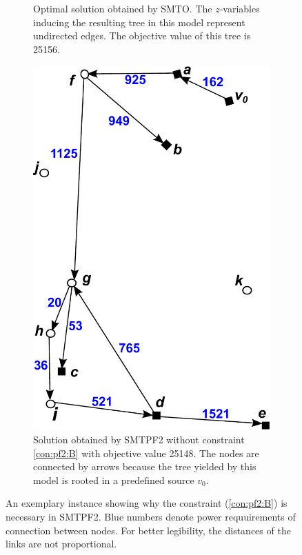 \begin{figure}[!htb]
\begin{subfigure}[b]{0.4\textwidth}
        \caption{Optimal solution obtained by SMTO. The $z$-variables inducing the resulting tree in this model represent undirected edges. The objective value of this tree is 25156.}
        \label{fig:BorigSMT}
    \end{subfigure}
    \hfill %
    \begin{subfigure}[b]{0.4\textwidth}
        \includegraphics[width=\textwidth]{conBNec2}
        \caption{Solution obtained by SMTPF2 without constraint \ref{con:pf2:B} with objective value 25148. The nodes are connected by arrows because the tree yielded by this model is rooted in a predefined source $v_0$.}
        \label{fig:Bpf2}
    \end{subfigure}
    \caption{An exemplary instance showing why the constraint (\ref{con:pf2:B}) is necessary in SMTPF2. Blue numbers denote power requuirements of connection between nodes. For better legibility, the distances of the links are not proportional.} \label{fig:BProof}
\end{figure}   
